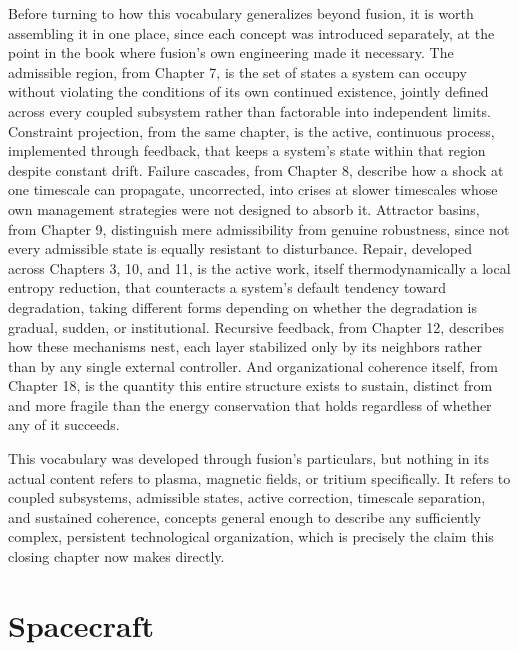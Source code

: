 Before turning to how this vocabulary generalizes beyond fusion, it is worth assembling it in one place, since each concept was introduced separately, at the point in the book where fusion's own engineering made it necessary. The admissible region, from Chapter 7, is the set of states a system can occupy without violating the conditions of its own continued existence, jointly defined across every coupled subsystem rather than factorable into independent limits. Constraint projection, from the same chapter, is the active, continuous process, implemented through feedback, that keeps a system's state within that region despite constant drift. Failure cascades, from Chapter 8, describe how a shock at one timescale can propagate, uncorrected, into crises at slower timescales whose own management strategies were not designed to absorb it. Attractor basins, from Chapter 9, distinguish mere admissibility from genuine robustness, since not every admissible state is equally resistant to disturbance. Repair, developed across Chapters 3, 10, and 11, is the active work, itself thermodynamically a local entropy reduction, that counteracts a system's default tendency toward degradation, taking different forms depending on whether the degradation is gradual, sudden, or institutional. Recursive feedback, from Chapter 12, describes how these mechanisms nest, each layer stabilized only by its neighbors rather than by any single external controller. And organizational coherence itself, from Chapter 18, is the quantity this entire structure exists to sustain, distinct from and more fragile than the energy conservation that holds regardless of whether any of it succeeds.

This vocabulary was developed through fusion's particulars, but nothing in its actual content refers to plasma, magnetic fields, or tritium specifically. It refers to coupled subsystems, admissible states, active correction, timescale separation, and sustained coherence, concepts general enough to describe any sufficiently complex, persistent technological organization, which is precisely the claim this closing chapter now makes directly.

\section{Spacecraft}

